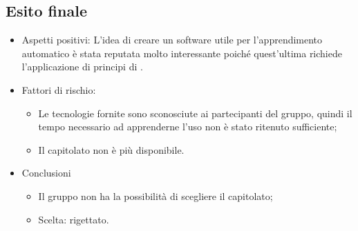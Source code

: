 \subsection{Esito finale}
    \begin{itemize}
        \item Aspetti positivi: L'idea di creare un software utile per l'apprendimento automatico è stata reputata molto interessante poiché quest'ultima richiede l'applicazione di principi di .
        \item Fattori di rischio: 
            \begin{itemize}
                \item Le tecnologie fornite sono sconosciute ai partecipanti del gruppo, quindi il tempo necessario ad apprenderne l'uso non è stato ritenuto sufficiente;
                \item Il capitolato non è più disponibile.
            \end{itemize}
        \item Conclusioni
            \begin {itemize}
                \item Il gruppo non ha la possibilità di scegliere il capitolato;
                \item Scelta: rigettato.
            \end {itemize}
    \end{itemize}